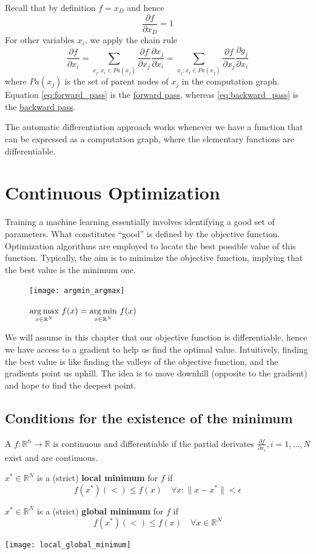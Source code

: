 \documentclass{article}
\begin{document}
Recall that by definition $f=x_D$ and hence
$$\frac{\partial{f}}{\partial{x_D}}=1$$
For other variables $x_i$, we apply the chain rule 
\begin{equation}\label{eq:backward_pass}
    \frac{\partial{f}}{\partial{x_i}}=\displaystyle\sum_{x_j:x_i\in
    Pa(x_j)}\frac{\partial{f}}{\partial{x_j}}\frac{\partial{x_j}}{\partial{x_i}}=\displaystyle\sum_{x_j:x_i\in
    Pa(x_j)}\frac{\partial{f}}{\partial{x_j}}\frac{\partial{g_j}}{\partial{x_i}}
\end{equation}
where $Pa(x_j)$ is the set of parent nodes of $x_j$ in the computation graph.
Equation \ref{eq:forward_pass} is the \underline{forward pass}, whereas
\ref{eq:backward_pass} is the \underline{backward pass}.

The automatic differentiation approach works whenever we have a function that
can be expressed as a computation graph, where the elementary functions are
differentiable. 
\cleardoublepage
\section{Continuous Optimization}
Training a machine learning essentially involves identifying a good set of
parameters. What constitutes ``good'' is defined by the objective function.
Optimization algorithms are employed to locate the best possible value of this
function. Typically, the aim is to minimize the objective function, implying
that the best value is the minimum one.

\begin{figure}[!h]
   \centering
   \texttt{[image: argmin\_argmax]}
   \caption{$\underset{x\in \mathbb{R}^N}{\operatorname*{arg\,max}}\
   f(x)=\underset{x\in\mathbb{R}^N}{\operatorname*{arg\,min}}\ {f(x)}$}
\end{figure}

We will assume in this chapter that our objective function is
differentiable, hence we have access to a gradient to help us find the
optimal value. Intuitively, finding the best value is like finding the valleys
of the objective function, and the gradients point us uphill. The idea is to
move downhill (opposite to the gradient) and hope to find the deepest point.
\subsection{Conditions for the existence of the minimum} 
\begin{definition}
    A $f:\mathbb{R}^n\to \mathbb{R}$ is continuous and differentiable if
    the partial derivates $\frac{\partial{f}}{\partial{x_i}},i=1,\ldots,N$
    exist and are continuous. 
\end{definition}
\begin{definition}
    $x^*\in \mathbb{R}^N$ is a (strict) \textbf{local minimum} for $f$ if 
    $$f(x^*)(<)\leq f(x)\quad \forall x: \lVert x-x^*\rVert<\epsilon$$
\end{definition}
\begin{definition}
    $x^*\in \mathbb{R}^N$ is a (strict) \textbf{global minimum} for $f$ if 
    $$f(x^*)(<)\leq f(x)\quad \forall x\in \mathbb{R}^N$$
\end{definition}
\begin{center}
    \texttt{[image: local\_global\_minimum]}
\end{center}
\end{document}
